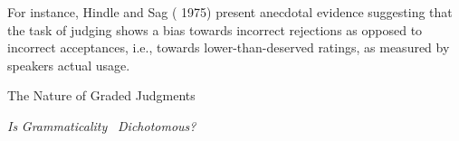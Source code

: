 \setcounter{listWWNumlvleveli}{2}
\begin{listWWNumlvleveli}
\item 
\setcounter{listWWNumlvlevelii}{1}
\begin{listWWNumlvlevelii}
\item 
\setcounter{listWWNumlvleveliii}{0}
\begin{listWWNumlvleveliii}
\item 
\begin{styleStandard}
For instance, Hindle and Sag ( 1975) present anecdotal evidence suggesting that the task of judging shows a bias towards incorrect rejections as opposed to incorrect acceptances, i.e., towards lower-than-deserved ratings, as measured by speakers{\textquotesingle} actual usage.
\end{styleStandard}


\end{listWWNumlvleveliii}
\end{listWWNumlvlevelii}
\end{listWWNumlvleveli}
\clearpage\setcounter{page}{1}\setcounter{listWWNumliiileveli}{2}
\begin{listWWNumliiileveli}
\item 
\setcounter{listWWNumliiilevelii}{2}
\begin{listWWNumliiilevelii}
\item 
\begin{styleTextbody}
The Nature of Graded Judgments
\end{styleTextbody}


\setcounter{listWWNumliiileveliii}{0}
\begin{listWWNumliiileveliii}
\item 
\begin{styleStandard}
\textit{Is}\textit{ }\textit{Grammaticality }\textit{\ }\textit{Dichotomous?}
\end{styleStandard}


\end{listWWNumliiileveliii}
\end{listWWNumliiilevelii}
\end{listWWNumliiileveli}
